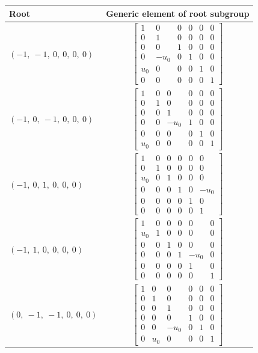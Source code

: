 \documentclass[11pt]{article}
\theoremstyle{definition}
\begin{document}
\noindent \begin{longtable}{|l|c|}
    \hline
    \textbf{Root} & \textbf{Generic element of root subgroup} \\
    \hline
    \endhead
    $\left( -1, \  -1, \  0, \  0, \  0, \  0\right)$ & ${\left[\begin{matrix}1 & 0 & 0 & 0 & 0 & 0\\0 & 1 & 0 & 0 & 0 & 0\\0 & 0 & 1 & 0 & 0 & 0\\0 & - u_{0} & 0 & 1 & 0 & 0\\u_{0} & 0 & 0 & 0 & 1 & 0\\0 & 0 & 0 & 0 & 0 & 1\end{matrix}\right]}$ \\
    \hline
    $\left( -1, \  0, \  -1, \  0, \  0, \  0\right)$ & ${\left[\begin{matrix}1 & 0 & 0 & 0 & 0 & 0\\0 & 1 & 0 & 0 & 0 & 0\\0 & 0 & 1 & 0 & 0 & 0\\0 & 0 & - u_{0} & 1 & 0 & 0\\0 & 0 & 0 & 0 & 1 & 0\\u_{0} & 0 & 0 & 0 & 0 & 1\end{matrix}\right]}$ \\
    \hline
    $\left( -1, \  0, \  1, \  0, \  0, \  0\right)$ & ${\left[\begin{matrix}1 & 0 & 0 & 0 & 0 & 0\\0 & 1 & 0 & 0 & 0 & 0\\u_{0} & 0 & 1 & 0 & 0 & 0\\0 & 0 & 0 & 1 & 0 & - u_{0}\\0 & 0 & 0 & 0 & 1 & 0\\0 & 0 & 0 & 0 & 0 & 1\end{matrix}\right]}$ \\
    \hline
    $\left( -1, \  1, \  0, \  0, \  0, \  0\right)$ & ${\left[\begin{matrix}1 & 0 & 0 & 0 & 0 & 0\\u_{0} & 1 & 0 & 0 & 0 & 0\\0 & 0 & 1 & 0 & 0 & 0\\0 & 0 & 0 & 1 & - u_{0} & 0\\0 & 0 & 0 & 0 & 1 & 0\\0 & 0 & 0 & 0 & 0 & 1\end{matrix}\right]}$ \\
    \hline
    $\left( 0, \  -1, \  -1, \  0, \  0, \  0\right)$ & ${\left[\begin{matrix}1 & 0 & 0 & 0 & 0 & 0\\0 & 1 & 0 & 0 & 0 & 0\\0 & 0 & 1 & 0 & 0 & 0\\0 & 0 & 0 & 1 & 0 & 0\\0 & 0 & - u_{0} & 0 & 1 & 0\\0 & u_{0} & 0 & 0 & 0 & 1\end{matrix}\right]}$ \\

\end{longtable}
\end{document}
